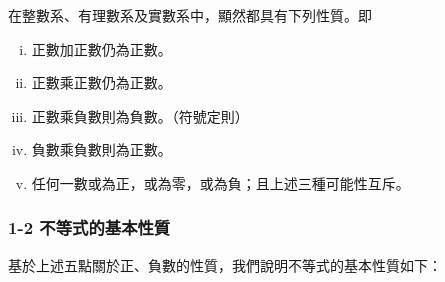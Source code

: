 在整數系、有理數系及實數系中，顯然都具有下列性質。即
\begin{enumerate}[(i)]
    \item 正數加正數仍為正數。
    \item 正數乘正數仍為正數。
    \item 正數乘負數則為負數。\quad （符號定則）
    \item 負數乘負數則為正數。
    \item 任何一數或為正，或為零，或為負；且上述三種可能性互斥。
\end{enumerate}

\subsubsection*{1-2 不等式的基本性質}

基於上述五點關於正、負數的性質，我們說明不等式的基本性質如下：
